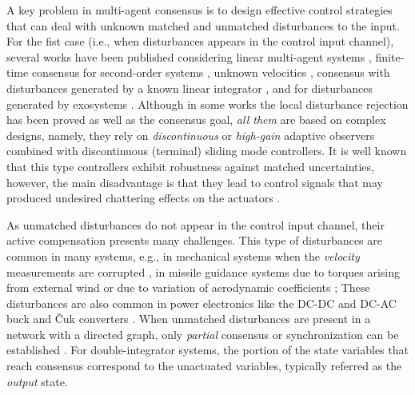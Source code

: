 \documentclass[journal,twoside]{IEEEtran}
\begin{document}
A key problem in multi-agent consensus is to design effective control strategies that can deal with unknown matched and unmatched disturbances to the input. 
For the fist case (i.e., when disturbances appears in the control input channel), several works have been published considering linear multi-agent systems \cite{LVetal17}, finite-time consensus for second-order systems \cite{ZHAOetal17}, unknown velocities \cite{TIALIULIU}, consensus with disturbances generated by a known linear integrator \cite{SUNetal}, and for disturbances generated by exosystems \cite{Yuetal23}. 
Although in some works the local disturbance rejection has been proved as well as the consensus goal, {\it all them} are based on complex designs, namely, they rely on {\it discontinuous} or {\it high-gain} adaptive observers combined with discontinuous (terminal) sliding mode controllers. 
It is well known that this type controllers exhibit robustness against matched uncertainties, however, the main disadvantage is that they lead to control signals that may produced undesired chattering effects on the actuators \cite{EDWSPU}. 
 
As unmatched disturbances do not appear in the control input channel, their active compensation presents many challenges.
This type of disturbances are common in many systems, e.g., in mechanical systems when the {\it velocity} measurements are corrupted \cite{ROMDONORT}, in missile guidance systems due to torques arising from external wind or due to variation of aerodynamic coefficients \cite{CHEN}; These disturbances are also common in power electronics like the DC-DC and DC-AC buck and {\^C}uk converters \cite{SUNetal, BATFOSOLI}. 
When unmatched disturbances are present in a network with a directed graph, only {\it partial} consensus or synchronization can be established \cite{SUNetal, WANGetal21}. 
For double-integrator systems, the portion of the state variables that reach consensus correspond to the unactuated variables, typically referred as the {\it output} state.
\end{document}
